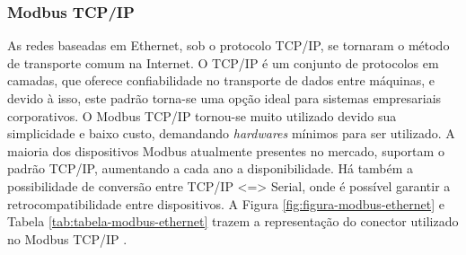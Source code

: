 	   \begin{table}[h!]	
        	\centering
        \end{table}
        
    \subsubsection{Modbus TCP/IP}
    \label{sec:modbus-tcp}

        As redes baseadas em Ethernet, sob o protocolo \gls{TCP/IP}, se tornaram o método de transporte comum na Internet. O \gls{TCP/IP} é um conjunto de protocolos em camadas, que oferece confiabilidade no transporte de dados entre máquinas, e devido à isso, este padrão torna-se uma opção ideal para sistemas empresariais corporativos. O Modbus \gls{TCP/IP} tornou-se muito utilizado devido sua simplicidade e baixo custo, demandando \textit{hardwares} mínimos para ser utilizado. A maioria dos dispositivos Modbus atualmente presentes no mercado, suportam o padrão \gls{TCP/IP}, aumentando a cada ano a disponibilidade. Há também a possibilidade de conversão entre TCP/IP <=> Serial, onde é possível garantir a retrocompatibilidade entre dispositivos. A Figura \ref{fig:figura-modbus-ethernet} e Tabela \ref{tab:tabela-modbus-ethernet} trazem a representação do conector utilizado no Modbus \gls{TCP/IP} \cite{Modbus}.

